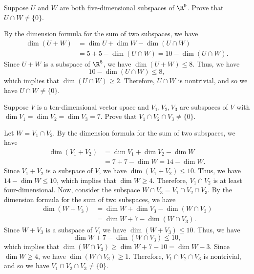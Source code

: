 \begin{exercise}
Suppose $U$ and $W$ are both five-dimensional subspaces of $\R^9$. Prove that
$U\cap W\ne\{0\}$.
\end{exercise}
\begin{solution}
By the dimension formula for the sum of two subspaces, we have
\begin{align*}
\dim(U+W) &= \dim U+\dim W-\dim(U\cap W)\\
  &= 5+5-\dim(U\cap W) = 10-\dim(U\cap W).
\end{align*}
Since $U+W$ is a subspace of $\R^8$, we have $\dim(U+W)\le8$. Thus, we have
\[ 10-\dim(U\cap W) \le 8, \]
which implies that $\dim(U\cap W)\ge2$. Therefore, $U\cap W$ is nontrivial, and
so we have $U\cap W\ne\{0\}$.
\end{solution}

\begin{exercise}
Suppose $V$ is a ten-dimensional vector space and $V_1,V_2,V_3$ are subspaces
of $V$ with $\dim V_1=\dim V_2=\dim V_3=7$. Prove that
$V_1\cap V_2\cap V_3\ne\{0\}$.
\end{exercise}
\begin{solution}
Let $W=V_1\cap V_2$. By the dimension formula for the sum of two subspaces, we
have
\begin{align*}
\dim(V_1+V_2) &= \dim V_1+\dim V_2-\dim W\\
  &= 7+7-\dim W = 14-\dim W.
\end{align*}
Since $V_1+V_2$ is a subspace of $V$, we have $\dim(V_1+V_2)\le10$. Thus, we
have $14-\dim W\le10$, which implies that $\dim W\ge4$. Therefore, $V_1\cap V_2$
is at least four-dimensional. Now, consider the subspace
$W\cap V_3=V_1\cap V_2\cap V_3$. By the dimension formula for the sum of two
subspaces, we have
\begin{align*}
\dim(W+V_3) &= \dim W+\dim V_3-\dim(W\cap V_3)\\
  &= \dim W+7-\dim(W\cap V_3).
\end{align*}
Since $W+V_3$ is a subspace of $V$, we have $\dim(W+V_3)\le10$. Thus, we have
\[ \dim W+7-\dim(W\cap V_3) \le 10, \]
which implies that $\dim(W\cap V_3)\ge\dim W+7-10=\dim W-3$. Since
$\dim W\ge4$, we have $\dim(W\cap V_3)\ge1$. Therefore, $V_1\cap V_2\cap V_3$ is
nontrivial, and so we have $V_1\cap V_2\cap V_3\ne\{0\}$.
\end{solution}

